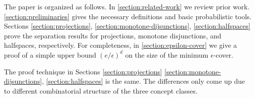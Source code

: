 The paper is organized as follows. In \autoref{section:related-work} we review
prior work. \autoref{section:preliminaries} gives the necessary definitions and
basic probabilistic tools. Sections \ref{section:projections},
\ref{section:monotone-dijsunctions}, \ref{section:halfspaces} prove the
separation results for projections, monotone disjunctions, and halfspaces,
respectively. For completeness, in \autoref{section:epsilon-cover} we give a
proof of a simple upper bound $(e/\epsilon)^d$ on the size of the minimum
$\epsilon$-cover.

The proof technique in Sections \ref{section:projections}
\ref{section:monotone-dijsunctions}, \ref{section:halfspaces} is the same. The
differences only come up due to different combinatorial structure of the
three concept classes.

